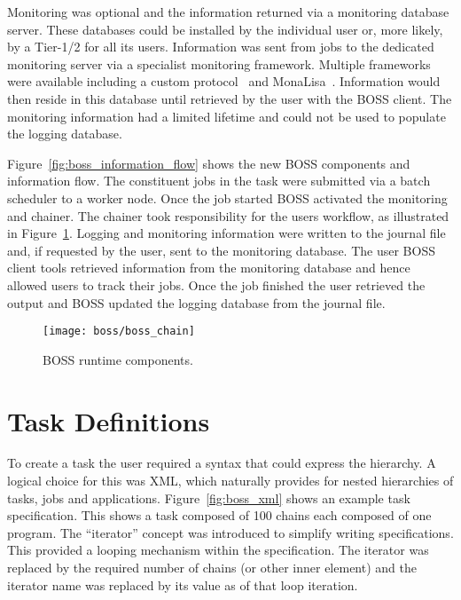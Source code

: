 Monitoring was optional and the information returned via a monitoring database server. These databases could be installed by the individual user or, more likely, by a Tier-1/2 for all its users. Information was sent from jobs to the dedicated monitoring server via a specialist monitoring framework. Multiple frameworks were available including a custom protocol~\cite{citeulike:880984} and MonaLisa~\cite{citeulike:880975}. Information would then reside in this database until retrieved by the user with the BOSS client. The monitoring information had a limited lifetime and could not be used to populate the logging database.

Figure~\ref{fig:boss_information_flow} shows the new BOSS components and information flow. The constituent jobs in the task were submitted via a batch scheduler to a worker node. Once the job started BOSS activated the monitoring and chainer. The chainer took responsibility for the users workflow, as illustrated in Figure~\ref{fig:boss_chain}. Logging and monitoring information were written to the journal file and, if requested by the user, sent to the monitoring database. The user BOSS client tools retrieved information from the monitoring database and hence allowed users to track their jobs. Once the job finished the user retrieved the output and BOSS updated the logging database from the journal file.

\begin{figure}[!tp]
  \centering
  \texttt{[image: boss/boss\_chain]}
  \caption{BOSS runtime components.~\cite{citeulike:880984}
  \label{fig:boss_chain}}
\end{figure}

\section{Task Definitions}
To create a task the user required a syntax that could express the hierarchy. A logical choice for this was XML, which naturally provides for nested hierarchies of tasks, jobs and applications. Figure~\ref{fig:boss_xml} shows an example task specification. This shows a task composed of 100 chains each composed of one program. The ``iterator'' concept was introduced to simplify writing specifications. This provided a looping mechanism within the specification. The iterator was replaced by the required number of chains (or other inner element) and the iterator name was replaced by its value as of that loop iteration. 

